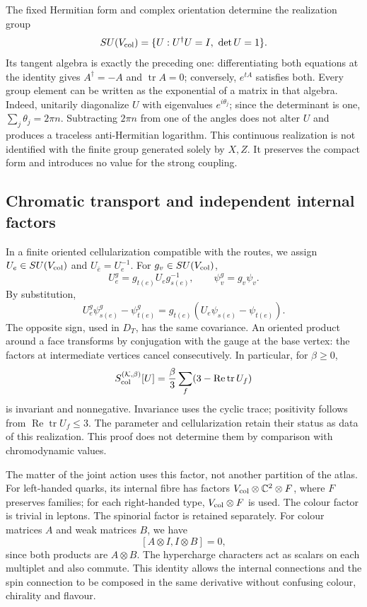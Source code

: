 The fixed Hermitian form and complex orientation determine the realization group
\[
 SU(V_{\rm col})=\{U:U^{\dagger}U=I,\ \det U=1\}.
\]
Its tangent algebra is exactly the preceding one: differentiating both equations at the identity gives \(A^{\dagger}=-A\) and \(\operatorname{tr}A=0\); conversely, \(e^{tA}\) satisfies both. Every group element can be written as the exponential of a matrix in that algebra. Indeed, unitarily diagonalize \(U\) with eigenvalues \(e^{i\theta_j}\); since the determinant is one, \(\sum_j\theta_j=2\pi n\). Subtracting \(2\pi n\) from one of the angles does not alter \(U\) and produces a traceless anti-Hermitian logarithm. This continuous realization is not identified with the finite group generated solely by \(X,Z\). It preserves the compact form and introduces no value for the strong coupling.

\subsection{Chromatic transport and independent internal factors}
\label{hmtcuatro:color:transporte}

In a finite oriented cellularization compatible with the routes, we assign \(U_e\in SU(V_{\rm col})\) and \(U_{\bar e}=U_e^{-1}\). For \(g_v\in SU(V_{\rm col})\),
\[
 U_e^g=g_{t(e)}U_eg_{s(e)}^{-1},\qquad
 \psi_v^g=g_v\psi_v.
\]
By substitution,
\[
 U_e^g\psi_{s(e)}^g-\psi_{t(e)}^g
 =g_{t(e)}(U_e\psi_{s(e)}-\psi_{t(e)}).
\]
The opposite sign, used in \(D_T\), has the same covariance. An oriented product around a face transforms by conjugation with the gauge at the base vertex: the factors at intermediate vertices cancel consecutively. In particular, for \(\beta\ge0\),
\[
 S_{\rm col}^{(\mathcal K,\beta)}[U]
 =\frac\beta3\sum_f(3-\operatorname{Re}\operatorname{tr}U_f)
\]
is invariant and nonnegative. Invariance uses the cyclic trace; positivity follows from \(\operatorname{Re}\operatorname{tr}U_f\le3\). The parameter and cellularization retain their status as data of this realization. This proof does not determine them by comparison with chromodynamic values.

The matter of the joint action uses this factor, not another partition of the atlas. For left-handed quarks, its internal fibre has factors \(V_{\rm col}\otimes\mathbb C^2\otimes F\), where \(F\) preserves families; for each right-handed type, \(V_{\rm col}\otimes F\) is used. The colour factor is trivial in leptons. The spinorial factor is retained separately. For colour matrices \(A\) and weak matrices \(B\), we have
\[
 [A\otimes I,I\otimes B]=0,
\]
since both products are \(A\otimes B\). The hypercharge characters act as scalars on each multiplet and also commute. This identity allows the internal connections and the spin connection to be composed in the same derivative without confusing colour, chirality and flavour.

